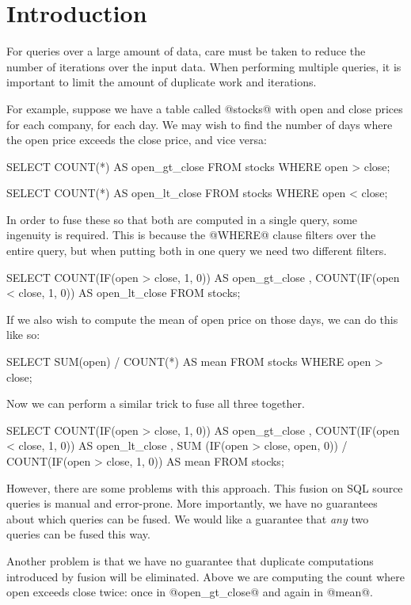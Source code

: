 \section{Introduction}
\label{s:Introduction}


For queries over a large amount of data, care must be taken to reduce the number of iterations over the input data.
When performing multiple queries, it is important to limit the amount of duplicate work and iterations.

For example, suppose we have a table called @stocks@ with open and close prices for each company, for each day.
We may wish to find the number of days where the open price exceeds the close price, and vice versa:
\begin{code}
SELECT COUNT(*) AS open_gt_close
FROM   stocks
WHERE  open > close;

SELECT COUNT(*) AS open_lt_close
FROM   stocks
WHERE  open < close;
\end{code}

In order to fuse these so that both are computed in a single query, some ingenuity is required.
This is because the @WHERE@ clause filters over the entire query, but when putting both in one query we need two different filters.
\begin{code}
SELECT COUNT(IF(open > close, 1, 0)) AS open_gt_close
     , COUNT(IF(open < close, 1, 0)) AS open_lt_close
FROM stocks;
\end{code}

If we also wish to compute the mean of open price on those days, we can do this like so:
\begin{code}
SELECT SUM(open) / COUNT(*) AS mean
FROM   stocks
WHERE  open > close;
\end{code}

Now we can perform a similar trick to fuse all three together.
\begin{code}
SELECT COUNT(IF(open > close, 1, 0)) AS open_gt_close
     , COUNT(IF(open < close, 1, 0)) AS open_lt_close
     , SUM  (IF(open > close, open, 0))
     / COUNT(IF(open > close, 1, 0)) AS mean
FROM stocks;
\end{code}

However, there are some problems with this approach.
This fusion on SQL source queries is manual and error-prone.
More importantly, we have no guarantees about which queries can be fused.
We would like a guarantee that \emph{any} two queries can be fused this way.

Another problem is that we have no guarantee that duplicate computations introduced by fusion will be eliminated.
Above we are computing the count where open exceeds close twice: once in @open_gt_close@ and again in @mean@.

